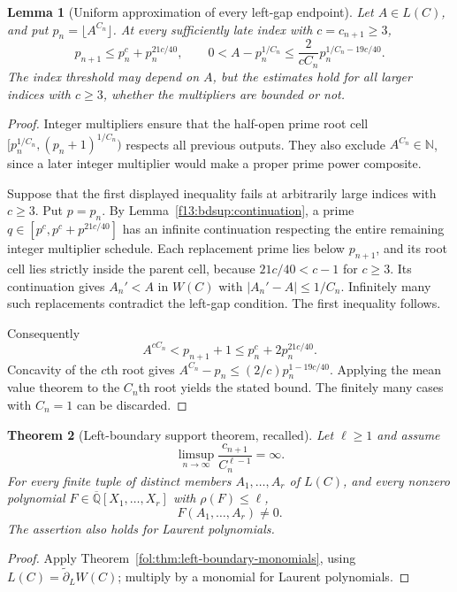 \documentclass[11pt,a4paper]{article}
\newtheorem{theorem}{Theorem}[section]
\newtheorem{lemma}[theorem]{Lemma}
\theoremstyle{definition}
\theoremstyle{remark}
\numberwithin{equation}{section}
\begin{document}
\begin{lemma}[Uniform approximation of every left-gap endpoint]
\label{f13:bdsup:localapprox}
Let $A\in L(C)$, and put $p_n=\lfloor A^{C_n}\rfloor$.
At every sufficiently late index with $c=c_{n+1}\ge3$,
\[
 p_{n+1}\le p_n^c+p_n^{21c/40},\qquad
 0<A-p_n^{1/C_n}
 \le \frac{2}{cC_n}p_n^{1/C_n-19c/40}.
\]
The index threshold may depend on $A$, but the estimates hold for all
larger indices with $c\ge3$, whether the multipliers are bounded or not.
\end{lemma}
\begin{proof}
Integer multipliers ensure that the half-open prime root cell
$[p_n^{1/C_n},(p_n+1)^{1/C_n})$ respects all previous outputs. They also exclude $A^{C_n}\in\mathbb N$, since a later
integer multiplier would make a proper prime power composite.

Suppose that the first displayed inequality fails at arbitrarily large
indices with $c\ge3$. Put $p=p_n$. By
Lemma~\ref{f13:bdsup:continuation}, a prime
$q\in[p^c,p^c+p^{21c/40}]$ has an infinite continuation respecting
the entire remaining integer multiplier schedule.
Each replacement prime lies below $p_{n+1}$, and its root cell lies
strictly inside the parent cell, because $21c/40<c-1$ for $c\ge3$.
Its continuation gives $A_n'<A$ in $W(C)$ with
$|A_n'-A|\le1/C_n$. Infinitely many such replacements contradict the
left-gap condition. The first inequality follows.

Consequently
\[
 A^{cC_n}<p_{n+1}+1\le p_n^c+2p_n^{21c/40}.
\]
Concavity of the $c$th root gives
$A^{C_n}-p_n\le(2/c)p_n^{1-19c/40}$.
Applying the mean value theorem to the $C_n$th root yields the stated
bound. The finitely many cases with $C_n=1$ can be discarded.
\end{proof}

\begin{theorem}[Left-boundary support theorem, recalled]
\label{f13:bdsup:main}
Let $\ell\ge1$ and assume
\[
 \boxed{\limsup_{n\to\infty}
       \frac{c_{n+1}}{C_n^{\ell-1}}=\infty.}
\]
For every finite tuple of distinct members $A_1,\ldots,A_r$ of $L(C)$,
and every nonzero polynomial
$F\in\overline{\mathbb Q}[X_1,\ldots,X_r]$ with $\rho(F)\le\ell$,
\[
 F(A_1,\ldots,A_r)\ne0.
\]
The assertion also holds for Laurent polynomials.
\end{theorem}
\begin{proof}
Apply Theorem~\ref{fol:thm:left-boundary-monomials}, using
$L(C)=\widetilde\partial_L W(C)$; multiply by a monomial for
Laurent polynomials.
\end{proof}
\end{document}

